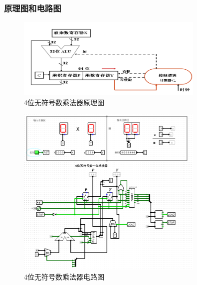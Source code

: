 \documentclass{article}
\begin{document}
    \subsubsection{原理图和电路图}
    \begin{figure}[H]
    \centering
    \includegraphics[width=0.8\textwidth]{4.4.1.png}
    \caption{4位无符号数乘法器原理图}
    \end{figure}

    \begin{figure}[H]
    \centering
    \includegraphics[width=0.8\textwidth]{4.4.2.png}
    \caption{4位无符号数乘法器电路图}
    \end{figure}
\end{document}
